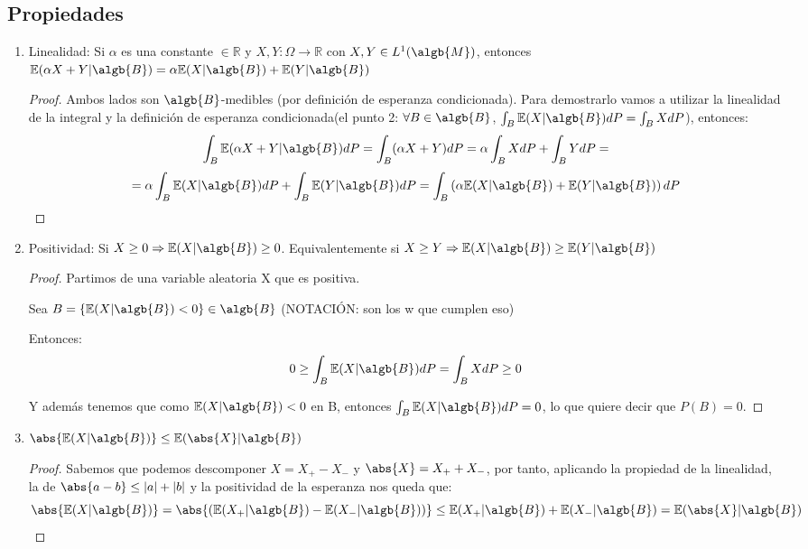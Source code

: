 \documentclass{apuntes}
\begin{document}
\subsection{Propiedades}
\begin{enumerate}
\item Linealidad: Si $\alpha$ es una constante $\in \mathbb{R}$ y $X,Y:\Omega \rightarrow \mathbb{R}$ con $X,Y \in L^1(\algb{M})$, entonces $\mathbb{E}(\alpha X + Y|\algb{B})=\alpha\mathbb{E}(X|\algb{B})+\mathbb{E}(Y|\algb{B})$

\begin{proof}
Ambos lados son $\algb{B}$-medibles (por definición de esperanza condicionada). Para demostrarlo vamos a utilizar la linealidad de la integral y la definición de esperanza condicionada(el punto 2: $\forall B \in \algb{B}$, $\int_{B}\mathbb{E}(X|\algb{B})dP=\int_{B}XdP$), entonces:
\[
\int_B \mathbb{E}(\alpha X + Y|\algb{B})dP= \int_B(\alpha X+Y)dP=\alpha\int_B XdP + \int_B YdP= 
\]
\[
=\alpha\int_B \mathbb{E}(X|\algb{B})dP + \int_B \mathbb{E}(Y|\algb{B})dP = \int_B \left(\alpha\mathbb{E}(X|\algb{B}) + \mathbb{E}(Y|\algb{B})\right)dP
\] 
\end{proof}
\item Positividad: Si $X \geq 0 \Rightarrow \mathbb{E}(X|\algb{B})\geq 0$. Equivalentemente si  $X \geq Y \Rightarrow \mathbb{E}(X|\algb{B})\geq \mathbb{E}(Y|\algb{B})$
\begin{proof}
Partimos de una variable aleatoria X que es positiva.

Sea $B=\{\mathbb{E}(X|\algb{B}) < 0\} \in \algb{B}$ (NOTACIÓN: son los w que cumplen eso)

Entonces:
\[
0 \geq  \int_B \mathbb{E}(X|\algb{B})dP = \int_B XdP \geq 0
\]

Y además tenemos que como $\mathbb{E}(X|\algb{B})<0$ en B, entonces $\int_B \mathbb{E}(X|\algb{B})dP=0$, lo que quiere decir que $P(B)=0$.
\end{proof}
\item $\abs{\mathbb{E}(X|\algb{B})} \leq \mathbb{E}(\abs{X}|\algb{B})$

\begin{proof}
Sabemos que podemos descomponer $X=X_+ - X_-$ y $\abs{X}=X_++X_-$, por tanto, aplicando la propiedad de la linealidad, la de $\abs{a-b} \leq |a|+|b|$ y la positividad de la esperanza nos queda que:
\[
\abs{\mathbb{E}(X|\algb{B})}=\abs{\left( \mathbb{E}(X_+|\algb{B}) - \mathbb{E}(X_-|\algb{B}) \right)} \leq \mathbb{E}(X_+|\algb{B})+\mathbb{E}(X_-|\algb{B})= \mathbb{E}(\abs{X}|\algb{B})
\]
 

\end{proof}
\end{enumerate}
\end{document}
